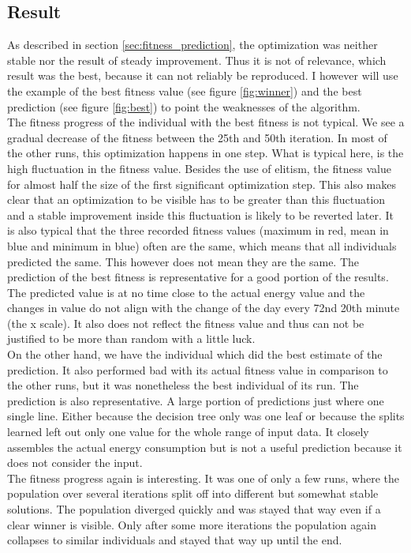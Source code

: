 \documentclass[conference]{IEEEtran}
\begin{document}
\subsection{Result}
As described in section \ref{sec:fitness_prediction}, the optimization was neither stable nor the result of steady improvement. Thus it is not of relevance, which result was the best, because it can not reliably be reproduced. I however will use the example of the best fitness value (see figure \ref{fig:winner}) and the best prediction (see figure \ref{fig:best}) to point the weaknesses of the algorithm.\\
The fitness progress of the individual with the best fitness is not typical. We see a gradual decrease of the fitness between the 25th and 50th iteration. In most of the other runs, this optimization happens in one step. What is typical here, is the high fluctuation in the fitness value. Besides the use of elitism, the fitness value for almost half the size of the first significant optimization step. This also makes clear that an optimization to be visible has to be greater than this fluctuation and a stable improvement inside this fluctuation is likely to be reverted later. It is also typical that the three recorded fitness values (maximum in red, mean in blue and minimum in blue) often are the same, which means that all individuals predicted the same. This however does not mean they are the same. The prediction of the best fitness is representative for a good portion of the results. The predicted value is at no time close to the actual energy value and the changes in value do not align with the change of the day every 72nd 20th minute (the x scale). It also does not reflect the fitness value and thus can not be justified to be more than random with a little luck.\\
On the other hand, we have the individual which did the best estimate of the prediction. It also performed bad with its actual fitness value in comparison to the other runs, but it was nonetheless the best individual of its run. The prediction is also representative. A large portion of predictions just where one single line. Either because the decision tree only was one leaf or because the splits learned left out only one value for the whole range of input data. It closely assembles the actual energy consumption but is not a useful prediction because it does not consider the input.\\
The fitness progress again is interesting. It was one of only a few runs, where the population over several iterations split off into different but somewhat stable solutions. The population diverged quickly and was stayed that way even if a clear winner is visible. Only after some more iterations the population again collapses to similar individuals and stayed that way up until the end.
\end{document}
